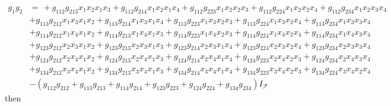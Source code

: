 \documentclass[aps,preprint]{revtex4}%
\begin{document}
\begin{align}
g_{1}g_{2}  &  =\,+\mathit{g}_{112}\mathit{g}_{213}x_{1}x_{2}x_{1}%
x_{3}+\mathit{g}_{112}\mathit{g}_{214}x_{1}x_{2}x_{1}x_{4}+\mathit{g}%
_{112}\mathit{g}_{223}x_{1}x_{2}x_{2}x_{3}+\mathit{g}_{112}\mathit{g}%
_{224}x_{1}x_{2}x_{2}x_{4}+\mathit{g}_{112}\mathit{g}_{234}x_{1}x_{2}%
x_{3}x_{4}\\
&  +\mathit{g}_{113}\mathit{g}_{212}x_{1}x_{3}x_{1}x_{2}+\mathit{g}%
_{113}\mathit{g}_{214}x_{1}x_{3}x_{1}x_{4}+\mathit{g}_{113}\mathit{g}%
_{223}x_{1}x_{3}x_{2}x_{3}+\mathit{g}_{113}\mathit{g}_{224}x_{1}x_{3}%
x_{2}x_{4}+\mathit{g}_{113}\mathit{g}_{234}x_{1}x_{3}x_{3}x_{4}\\
&  +\mathit{g}_{114}\mathit{g}_{212}x_{1}x_{4}x_{1}x_{2}+\mathit{g}%
_{114}\mathit{g}_{213}x_{1}x_{4}x_{1}x_{3}+\mathit{g}_{114}\mathit{g}%
_{223}x_{1}x_{4}x_{2}x_{3}+\mathit{g}_{114}\mathit{g}_{224}x_{1}x_{4}%
x_{2}x_{4}+\mathit{g}_{114}\mathit{g}_{234}x_{1}x_{4}x_{3}x_{4}\\
&  +\mathit{g}_{123}\mathit{g}_{212}x_{2}x_{3}x_{1}x_{2}+\mathit{g}%
_{123}\mathit{g}_{213}x_{2}x_{3}x_{1}x_{3}+\mathit{g}_{123}\mathit{g}%
_{214}x_{2}x_{3}x_{1}x_{4}+\mathit{g}_{123}\mathit{g}_{224}x_{2}x_{3}%
x_{2}x_{4}+\mathit{g}_{123}\mathit{g}_{234}x_{2}x_{3}x_{3}x_{4}\\
&  +\mathit{g}_{124}\mathit{g}_{212}x_{2}x_{4}x_{1}x_{2}+\mathit{g}%
_{124}\mathit{g}_{213}x_{2}x_{4}x_{1}x_{3}+\mathit{g}_{124}\mathit{g}%
_{214}x_{2}x_{4}x_{1}x_{4}+\mathit{g}_{124}\mathit{g}_{223}x_{2}x_{4}%
x_{2}x_{3}+\mathit{g}_{124}\mathit{g}_{234}x_{2}x_{4}x_{3}x_{4}\\
&  +\mathit{g}_{134}\mathit{g}_{212}x_{3}x_{4}x_{1}x_{2}+\mathit{g}%
_{134}\mathit{g}_{213}x_{3}x_{4}x_{1}x_{3}+\mathit{g}_{134}\mathit{g}%
_{214}x_{3}x_{4}x_{1}x_{4}+\mathit{g}_{134}\mathit{g}_{223}x_{3}x_{4}%
x_{2}x_{3}+\mathit{g}_{134}\mathit{g}_{224}x_{3}x_{4}x_{2}x_{4}\\
&  -\left(  \mathit{g}_{112}\mathit{g}_{212}+\mathit{g}_{113}\mathit{g}%
_{213}+\mathit{g}_{114}\mathit{g}_{214}+\mathit{g}_{123}\mathit{g}%
_{223}+\mathit{g}_{124}\mathit{g}_{224}+\mathit{g}_{134}\mathit{g}%
_{234}\right)  I_{\mathcal{F}}%
\end{align}
then%
\end{document}
